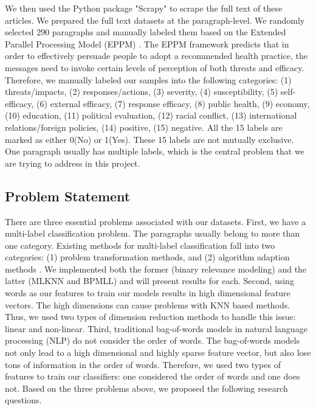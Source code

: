 \documentclass[11pt]{article}
\begin{document}
We then used the Python package "Scrapy" to scrape the full text of these articles. We prepared the full text datasets at the paragraph-level. We randomly selected 290 paragraphs and manually labeled them based on the Extended Parallel Processing Model (EPPM) \cite{witte1992putting, witte1994fear}. The EPPM framework predicts that in order to effectively persuade people to adopt a recommended health practice, the messages need to invoke certain levels of perception of both threats and efficacy. Therefore, we manually labeled our samples into the following categories: (1) threats/impacts, (2) responses/actions, (3) severity, (4) susceptibility, (5) self-efficacy, (6) external efficacy, (7) response efficacy, (8) public health, (9) economy, (10) education, (11) political evaluation, (12) racial conflict, (13) international relations/foreign policies, (14) positive, (15) negative. All the 15 labels are marked as either 0(No) or 1(Yes). These 15 labels are not mutually exclusive. One paragraph usually has multiple labels, which is the central problem that we are trying to address in this project.

\subsection{Problem Statement}

There are three essential problems associated with our datasets. First, we have a multi-label classification problem. The paragraphs usually belong to more than one category. Existing methods for multi-label classification fall into two categories: (1) problem transformation methods, and (2) algorithm adaption methods \cite{tsoumakas2007multi}. We implemented both the former (binary relevance modeling) and the latter (MLKNN and BPMLL) and will present results for each. Second, using words as our features to train our models results in high dimensional feature vectors. The high dimensions can cause problems with KNN based methods. Thus, we used two types of dimension reduction methods to handle this issue: linear and non-linear. Third, traditional bag-of-words models in natural language processing (NLP) do not consider the order of words. The bag-of-words models not only lead to a high dimensional and highly sparse feature vector, but also lose tons of information in the order of words. Therefore, we used two types of features to train our classifiers: one considered the order of words and one does not. Based on the three problems above, we proposed the following research questions.
\end{document}
